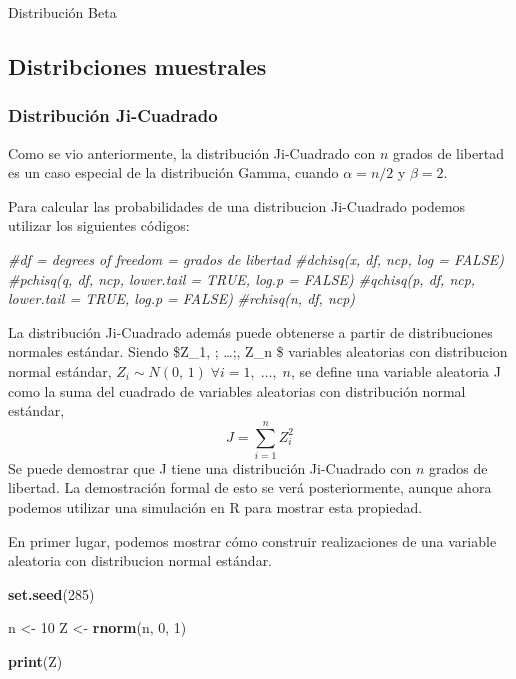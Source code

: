 \documentclass[]{article}
\newenvironment{Shaded}{\begin{snugshade}}{\end{snugshade}}
\newcommand{\CommentTok}[1]{\textcolor[rgb]{0.56,0.35,0.01}{\textit{#1}}}
\newcommand{\DecValTok}[1]{\textcolor[rgb]{0.00,0.00,0.81}{#1}}
\newcommand{\KeywordTok}[1]{\textcolor[rgb]{0.13,0.29,0.53}{\textbf{#1}}}
\newcommand{\NormalTok}[1]{#1}
\newcommand{\StringTok}[1]{\textcolor[rgb]{0.31,0.60,0.02}{#1}}
\begin{document}
Distribución Beta

\hypertarget{distribciones-muestrales}{%
\subsection{Distribciones muestrales}\label{distribciones-muestrales}}

\hypertarget{distribucion-ji-cuadrado}{%
\subsubsection{Distribución
Ji-Cuadrado}\label{distribucion-ji-cuadrado}}

Como se vio anteriormente, la distribución Ji-Cuadrado con \(n\) grados
de libertad es un caso especial de la distribución Gamma, cuando
\(\alpha = n/2\) y \(\beta=2\).

Para calcular las probabilidades de una distribucion Ji-Cuadrado podemos
utilizar los siguientes códigos:

\begin{Shaded}
\begin{Highlighting}[]
\CommentTok{#df = degrees of freedom = grados de libertad}
\CommentTok{#dchisq(x, df, ncp, log = FALSE)}
\CommentTok{#pchisq(q, df, ncp, lower.tail = TRUE, log.p = FALSE)}
\CommentTok{#qchisq(p, df, ncp, lower.tail = TRUE, log.p = FALSE)}
\CommentTok{#rchisq(n, df, ncp)}
\end{Highlighting}
\end{Shaded}

La distribución Ji-Cuadrado además puede obtenerse a partir de
distribuciones normales estándar. Siendo \$Z\_1, ; \ldots;, Z\_n \$
variables aleatorias con distribucion normal estándar,
\(Z_i \sim N(0,\,1) \; \forall i = 1, \; \ldots, \; n\), se define una
variable aleatoria J como la suma del cuadrado de variables aleatorias
con distribución normal estándar, \[
J = \sum_{i=1}^n Z_i^2
\] Se puede demostrar que J tiene una distribución Ji-Cuadrado con \(n\)
grados de libertad. La demostración formal de esto se verá
posteriormente, aunque ahora podemos utilizar una simulación en R para
mostrar esta propiedad.

En primer lugar, podemos mostrar cómo construir realizaciones de una
variable aleatoria con distribucion normal estándar.

\begin{Shaded}
\begin{Highlighting}[]
\KeywordTok{set.seed}\NormalTok{(}\DecValTok{285}\NormalTok{)}

\NormalTok{n <-}\StringTok{ }\DecValTok{10}
\NormalTok{Z <-}\StringTok{ }\KeywordTok{rnorm}\NormalTok{(n, }\DecValTok{0}\NormalTok{, }\DecValTok{1}\NormalTok{)}

\KeywordTok{print}\NormalTok{(Z)}
\end{Highlighting}
\end{Shaded}
\end{document}
